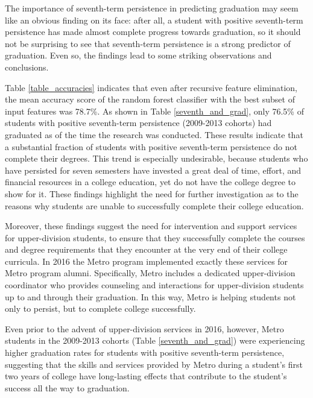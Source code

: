 The importance of seventh-term persistence in predicting graduation may seem like an obvious finding on its face: after all, a student with positive seventh-term persistence has made almost complete progress towards graduation, so it should not be surprising to see that seventh-term persistence is a strong predictor of graduation.  Even so, the findings lead to some striking observations and conclusions.  

Table \ref{table_accuracies} indicates that even after recursive feature elimination, the mean accuracy score of the random forest classifier with the best subset of input features was 78.7\%.  As shown in Table \ref{seventh_and_grad}, only 76.5\% of students with positive seventh-term persistence (2009-2013 cohorts) had graduated as of the time the research was conducted.  These results indicate that a substantial fraction of students with positive seventh-term persistence do not complete their degrees.  This trend is especially undesirable, because students who have persisted for seven semesters have invested a great deal of time, effort, and financial resources in a college education, yet do not have the college degree to show for it.  These findings highlight the need for further investigation as to the reasons why students are unable to successfully complete their college education.  

Moreover, these findings suggest the need for intervention and support services for upper-division students, to ensure that they successfully complete the courses and degree requirements that they encounter at the very end of their college curricula.  In 2016 the Metro program implemented exactly these services for Metro program alumni.  Specifically, Metro includes a dedicated upper-division coordinator who provides counseling and interactions for upper-division students up to and through their graduation.  In this way, Metro is helping students not only to persist, but to complete college successfully.  

Even prior to the advent of upper-division services in 2016, however, Metro students in the 2009-2013 cohorts (Table \ref{seventh_and_grad}) were experiencing higher graduation rates for students with positive seventh-term persistence, suggesting that the skills and services provided by Metro during a student's first two years of college have long-lasting effects that contribute to the student's success all the way to graduation.  

